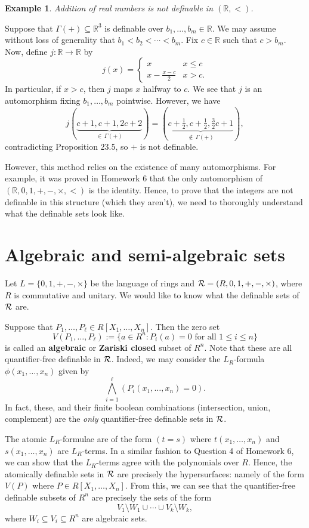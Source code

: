 \documentclass[10pt]{article}
\makeatletter
\newcommand{\R}{\mathbb{R}}
\theoremstyle{newstyle}
\newtheorem{exmp}[thm]{Example}
\newenvironment{pf}[1][\proofname]{\par
  \pushQED{\qed}%
  \normalfont \topsep0\p@\relax
  \trivlist
  \item[\hskip\labelsep\scshape
  #1\@addpunct{.}]\ignorespaces
}{%
  \popQED\endtrivlist\@endpefalse
}
\makeatother
\begin{document}
\begin{exmp}
Addition of real numbers is not definable in $(\R, <)$.
\end{exmp}
\begin{pf}
Suppose that $\Gamma(+) \subseteq \R^3$ is definable over $b_1, \dots, b_m \in \R$. 
We may assume without loss of generality that $b_1 < b_2 < \cdots < b_m$. Fix 
$c \in \R$ such that $c > b_m$. Now, define $j : \R \to \R$ by 
\[ j(x) = \begin{cases} x & x \leq c \\ x - \frac{x-c}2 & x > c. \end{cases} \]
In particular, if $x > c$, then $j$ maps $x$ halfway to $c$. We see that $j$ is an 
automorphism fixing $b_1, \dots, b_m$ pointwise. However, we have 
\[ j(\underbrace{c+1, c+1, 2c+2}_{\in\,\Gamma(+)}) = (\underbrace{c + \tfrac12, c + \tfrac12, \tfrac32 c + 1}_{\notin\,\Gamma(+)}), \] 
contradicting Proposition 23.5, so $+$ is not definable.
\end{pf}

However, this method relies on the existence of many automorphisms. For example, it was proved 
in Homework 6 that the only automorphism of $(\R, 0, 1, +, -, \times, <)$ is the identity. 
Hence, to prove that the integers are not definable in this structure (which they 
aren't), we need to thoroughly understand what the definable sets look like. 

\newpage
\section{Algebraic and semi-algebraic sets}

Let $L = \{0, 1, +, -, \times\}$ be the language of rings and ${\cal R} = (R, 0, 1, +, -, \times)$, 
where $R$ is commutative and unitary. We would like to know what the definable sets of ${\cal R}$ are.

Suppose that $P_1, \dots, P_\ell \in R[X_1, \dots, X_n]$. Then the zero set 
\[ V(P_1, \dots, P_\ell) := \{a \in R^n : P_i(a) = 0 \text{ for all } 1 \leq i \leq n\} \] 
is called an {\bf algebraic} or {\bf Zariski closed} subset of $R^n$. Note that these 
are all quantifier-free definable in ${\cal R}$. Indeed, we may consider the $L_R$-formula 
$\phi(x_1, \dots, x_n)$ given by 
\[ \bigwedge_{i=1}^\ell (P_i(x_1, \dots, x_n) = 0). \] 
In fact, these, and their finite boolean combinations (intersection, union, complement) 
are the {\it only} quantifier-free definable sets in ${\cal R}$.

The atomic $L_R$-formulae are of the form $(t = s)$ where $t(x_1, \dots, x_n)$ and 
$s(x_1, \dots, x_n)$ are $L_R$-terms. In a similar fashion to Question 4 of Homework 6, 
we can show that the $L_R$-terms agree with the polynomials over $R$. Hence, the atomically 
definable sets in ${\cal R}$ are precisely the hypersurfaces: namely of the form 
$V(P)$ where $P \in R[X_1, \dots, X_n]$. From this, we can see that the quantifier-free definable 
subsets of $R^n$ are precisely the sets of the form 
\[ V_1 \setminus W_1 \cup \cdots \cup V_k \setminus W_k, \] 
where $W_i \subseteq V_i \subseteq R^n$ are algebraic sets. 
\end{document}
